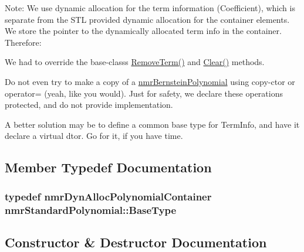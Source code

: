 Note\+: We use dynamic allocation for the term information (Coefficient), which is separate from the S\+T\+L provided dynamic allocation for the container elements. We store the pointer to the dynamically allocated term info in the container. Therefore\+:
\begin{DoxyEnumerate}
\item We had to override the base-\/class\textquotesingle{}s \hyperlink{classnmr_standard_polynomial_a0149f843c87d2082933b4d317f9ca69d}{Remove\+Term()} and \hyperlink{classnmr_standard_polynomial_a7efcdc4097121d65de20dde2523e6525}{Clear()} methods.
\item Do not even try to make a copy of a \hyperlink{classnmr_bernstein_polynomial}{nmr\+Bernstein\+Polynomial} using copy-\/ctor or operator= (yeah, like you would). Just for safety, we declare these operations protected, and do not provide implementation.
\item A better solution may be to define a common base type for Term\+Info, and have it declare a virtual dtor. Go for it, if you have time. 
\end{DoxyEnumerate}

\subsection{Member Typedef Documentation}
\hypertarget{classnmr_standard_polynomial_ae0b28e9d73a5480047ee5d85be633b89}{}
\subsubsection[{Base\+Type}]{\setlength{\rightskip}{0pt plus 5cm}typedef {\bf nmr\+Dyn\+Alloc\+Polynomial\+Container} {\bf nmr\+Standard\+Polynomial\+::\+Base\+Type}}\label{classnmr_standard_polynomial_ae0b28e9d73a5480047ee5d85be633b89}


\subsection{Constructor \& Destructor Documentation}
\hypertarget{classnmr_standard_polynomial_a3d2dfe48e85cab4978e4d1263a4e986b}{}
